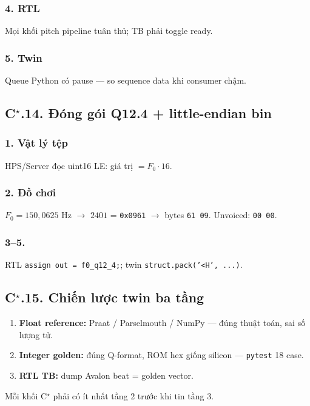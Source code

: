 \subsubsection*{4. RTL} Mọi khối pitch pipeline tuân thủ; TB phải toggle ready.

\subsubsection*{5. Twin} Queue Python có pause --- so sequence data khi consumer chậm.

\subsection*{C$^\star$.14. Đóng gói Q12.4 + little-endian bin}

\subsubsection*{1. Vật lý tệp} HPS/Server đọc uint16 LE: giá trị $=F_0\cdot16$.

\subsubsection*{2. Đồ chơi} $F_0=150{,}0625\text{ Hz}$ $\to$ $2401$ = \texttt{0x0961} $\to$ bytes \texttt{61 09}. Unvoiced: \texttt{00 00}.

\subsubsection*{3--5.} RTL \texttt{assign out = f0\_q12\_4;}; twin \texttt{struct.pack('<H', ...)}.

\subsection*{C$^\star$.15. Chiến lược twin ba tầng}

\begin{enumerate}\setlength{\itemsep}{2pt}
\item \textbf{Float reference:} Praat / Parselmouth / NumPy --- đúng thuật toán, sai số lượng tử.
\item \textbf{Integer golden:} đúng Q-format, ROM hex giống silicon --- \texttt{pytest} 18 case.
\item \textbf{RTL TB:} dump Avalon beat = golden vector.
\end{enumerate}
Mỗi khối C$^\star$ phải có ít nhất tầng 2 trước khi tin tầng 3.

\newpage
